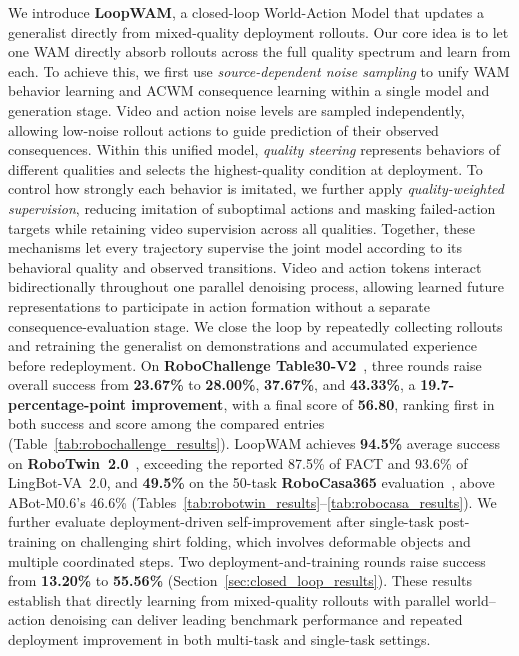 We introduce \textbf{LoopWAM}, a closed-loop World-Action Model that updates a generalist directly from mixed-quality deployment rollouts.
Our core idea is to let one WAM directly absorb rollouts across the full quality spectrum and learn from each.
To achieve this, we first use \emph{source-dependent noise sampling} to unify WAM behavior learning and ACWM consequence learning within a single model and generation stage.
Video and action noise levels are sampled independently, allowing low-noise rollout actions to guide prediction of their observed consequences.
Within this unified model, \emph{quality steering} represents behaviors of different qualities and selects the highest-quality condition at deployment.
To control how strongly each behavior is imitated, we further apply \emph{quality-weighted supervision}, reducing imitation of suboptimal actions and masking failed-action targets while retaining video supervision across all qualities.
Together, these mechanisms let every trajectory supervise the joint model according to its behavioral quality and observed transitions.
Video and action tokens interact bidirectionally throughout one parallel denoising process, allowing learned future representations to participate in action formation without a separate consequence-evaluation stage.
We close the loop by repeatedly collecting rollouts and retraining the generalist on demonstrations and accumulated experience before redeployment.
On \textbf{RoboChallenge Table30-V2}~\citep{robochallenge2026table30v2}, three rounds raise overall success from \textbf{23.67\%} to \textbf{28.00\%}, \textbf{37.67\%}, and \textbf{43.33\%}, a \textbf{19.7-percentage-point improvement}, with a final score of \textbf{56.80}, ranking first in both success and score among the compared entries (Table~\ref{tab:robochallenge_results}).
LoopWAM achieves \textbf{94.5\%} average success on \textbf{RoboTwin~2.0}~\citep{chen2025robotwin2}, exceeding the reported 87.5\% of FACT and 93.6\% of LingBot-VA~2.0, and \textbf{49.5\%} on the 50-task \textbf{RoboCasa365} evaluation~\citep{nasiriany2026robocasa365}, above ABot-M0.6's 46.6\% (Tables~\ref{tab:robotwin_results}--\ref{tab:robocasa_results}).
We further evaluate deployment-driven self-improvement after single-task post-training on challenging shirt folding, which involves deformable objects and multiple coordinated steps.
Two deployment-and-training rounds raise success from \textbf{13.20\%} to \textbf{55.56\%} (Section~\ref{sec:closed_loop_results}).
These results establish that directly learning from mixed-quality rollouts with parallel world--action denoising can deliver leading benchmark performance and repeated deployment improvement in both multi-task and single-task settings.

